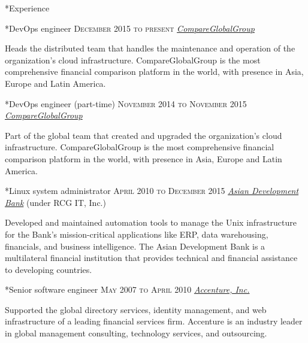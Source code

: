 \documentclass[10pt, a4paper, final]{article}
\begin{document}
\hfill
\begin{minipage}[t]{0.65\linewidth}
  \begin{section}*{Experience}
    \begin{subsection}*{DevOps engineer \hfill\textsc{December 2015 to present}}
      \href{http://www.compareglobalgroup.com}{\textit{CompareGlobalGroup}}  

      Heads the distributed team that handles the maintenance and operation of the organization's cloud infrastructure. CompareGlobalGroup is the most comprehensive financial comparison platform in the world, with presence in Asia, Europe and Latin America.
    \end{subsection}
    \vspace{1em}
  
    \begin{subsection}*{DevOps engineer (part-time) \hfill\textsc{November 2014 to November 2015}}
      \href{http://www.compareglobalgroup.com}{\textit{CompareGlobalGroup}}  

      Part of the global team that created and upgraded the organization's cloud infrastructure. CompareGlobalGroup is the most comprehensive financial comparison platform in the world, with presence in Asia, Europe and Latin America.
    \end{subsection}
    \vspace{1em}
  
    \begin{subsection}*{Linux system administrator \hfill\textsc{April 2010 to December 2015}}
      \href{http://www.adb.org/}{\textit{Asian Development Bank}} (under RCG IT, Inc.) 

      Developed and maintained automation tools to manage the Unix infrastructure for the Bank's mission-critical applications like ERP, data warehousing, financials, and business intelligence. The Asian Development Bank is a multilateral financial institution that provides technical and financial assistance to developing countries.
    \end{subsection}
    \vspace{1em}
  
    \begin{subsection}*{Senior software engineer \hfill\textsc{May 2007 to April 2010}}
      \href{http://www.accenture.com}{\textit{Accenture, Inc.}}  

      Supported the global directory services, identity management, and web infrastructure of a leading financial services firm. Accenture is an industry leader in global management consulting, technology services, and outsourcing.
    \end{subsection}
    \vspace{1em}
  

\end{section}
\end{minipage}
\end{document}
